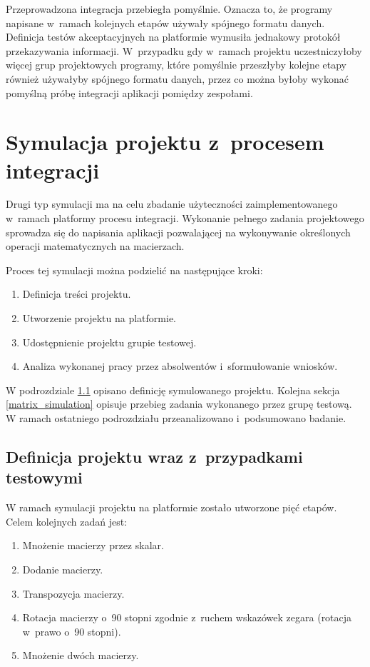 Przeprowadzona integracja przebiegła pomyślnie.
Oznacza to, że programy napisane w~ramach kolejnych etapów używały spójnego formatu danych.
Definicja testów akceptacyjnych na platformie wymusiła jednakowy protokół przekazywania informacji.
W~przypadku gdy w~ramach projektu uczestniczyłoby więcej grup projektowych programy, które pomyślnie przeszłyby kolejne etapy również używałyby spójnego formatu danych, przez co można byłoby wykonać pomyślną próbę integracji aplikacji pomiędzy zespołami.

\section{Symulacja projektu z~procesem integracji}
\label{research_matrix}

Drugi typ symulacji ma na celu zbadanie użyteczności zaimplementowanego w~ramach platformy procesu integracji.
Wykonanie pełnego zadania projektowego sprowadza się do napisania aplikacji pozwalającej na wykonywanie określonych operacji matematycznych na macierzach.

Proces tej symulacji można podzielić na następujące kroki:
\begin{enumerate}
    \item Definicja treści projektu.
    \item Utworzenie projektu na platformie.
    \item Udostępnienie projektu grupie testowej.
    \item Analiza wykonanej pracy przez absolwentów i~sformułowanie wniosków.
\end{enumerate}

W podrozdziale \ref{matrix_project_definition} opisano definicję symulowanego projektu.
Kolejna sekcja \ref{matrix_simulation} opisuje przebieg zadania wykonanego przez grupę testową.
W ramach ostatniego podrozdziału przeanalizowano i~podsumowano badanie.


\subsection{Definicja projektu wraz z~przypadkami testowymi}
\label{matrix_project_definition}

W ramach symulacji projektu na platformie zostało utworzone pięć etapów.
Celem kolejnych zadań jest:
\begin{enumerate}
    \item Mnożenie macierzy przez skalar.
    \item Dodanie macierzy.
    \item Transpozycja macierzy.
    \item Rotacja macierzy o~90 stopni zgodnie z~ruchem wskazówek zegara (rotacja w~prawo o~90 stopni).
    \item Mnożenie dwóch macierzy.
\end{enumerate}

